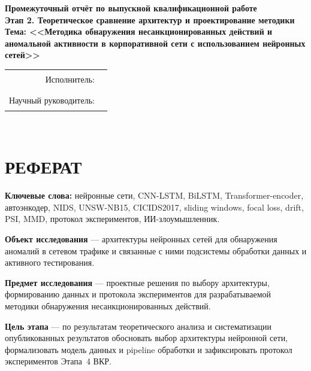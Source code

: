 \documentclass[14pt, a4paper]{extarticle}
\begin{document}
\begin{titlepage}
\centering
\vspace*{1cm}

{\large\bfseries Промежуточный отчёт по выпускной квалификационной работе}\\[0.3cm]
{\large\bfseries Этап 2. Теоретическое сравнение архитектур и проектирование методики}\\[2cm]

{\Large\bfseries Тема: <<Методика обнаружения несанкционированных действий
и аномальной активности в корпоративной сети с использованием нейронных
сетей>>}\\[3cm]

\begin{flushright}
\begin{tabular}{rl}
Исполнитель: & \rule{6cm}{0.4pt} \\[0.3cm]
Научный руководитель: & \rule{6cm}{0.4pt} \\
\end{tabular}
\end{flushright}

\vfill
{\large \the\year}\\
\end{titlepage}

\section*{РЕФЕРАТ}

\textbf{Ключевые слова:} нейронные сети, CNN-LSTM, BiLSTM, Transformer-encoder,
автоэнкодер, NIDS, UNSW-NB15, CICIDS2017, sliding windows, focal loss,
drift, PSI, MMD, протокол экспериментов, ИИ-злоумышленник.

\textbf{Объект исследования} --- архитектуры нейронных сетей для
обнаружения аномалий в сетевом трафике и связанные с ними подсистемы
обработки данных и активного тестирования.

\textbf{Предмет исследования} --- проектные решения по выбору архитектуры,
формированию данных и протокола экспериментов для разрабатываемой
методики обнаружения несанкционированных действий.

\textbf{Цель этапа} --- по результатам теоретического анализа и
систематизации опубликованных результатов обосновать выбор архитектуры
нейронной сети, формализовать модель данных и pipeline обработки и
зафиксировать протокол экспериментов Этапа~4 ВКР.
\end{document}
